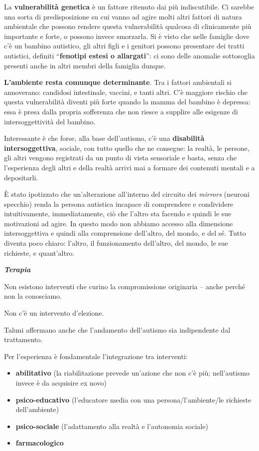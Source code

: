 \documentclass[]{article}
\begin{document}
La \textbf{vulnerabilità genetica} è un fattore ritenuto dai più
indiscutibile. Ci sarebbe una sorta di predisposizione su cui vanno ad
agire molti altri fattori di natura ambientale che possono rendere
questa vulnerabilità qualcosa di clinicamente più importante e forte, o
possono invece smorzarla. Si è visto che nelle famiglie dove c'è un
bambino autistico, gli altri figli e i genitori possono presentare dei
tratti autistici, definiti ``\textbf{fenotipi estesi o allargati}'': ci
sono delle anomalie sottosoglia presenti anche in altri membri della
famiglia dunque.

\textbf{L'ambiente resta comunque determinante}. Tra i fattori
ambientali si annoverano: candidosi intestinale, vaccini, e tanti altri.
C'è maggiore rischio che questa vulnerabilità diventi più forte quando
la mamma del bambino è depressa: essa è presa dalla propria sofferenza
che non riesce a supplire alle esigenze di intersoggettività del
bambino.

Interessante è che forse, alla base dell'autismo, c'è una
\textbf{disabilità intersoggettiva}, sociale, con tutto quello che ne
consegue: la realtà, le persone, gli altri vengono registrati da un
punto di vista sensoriale e basta, senza che l'esperienza degli altri e
della realtà arrivi mai a formare dei contenuti mentali e a depositarli.

È stato ipotizzato che un'alterazione all'interno del circuito dei
\emph{mirrors} (neuroni specchio) renda la persona autistica incapace di
comprendere e condividere intuitivamente, immediatamente, ciò che
l'altro sta facendo e quindi le sue motivazioni ad agire. In questo modo
non abbiamo accesso alla dimensione intersoggettiva e quindi alla
comprensione dell'altro, del mondo, e del sé. Tutto diventa poco chiaro:
l'altro, il funzionamento dell'altro, del mondo, le sue richieste, e
quant'altro.

\emph{\textbf{Terapia}}

Non esistono interventi che curino la compromissione originaria -- anche
perché non la conosciamo.

Non c'è un intervento d'elezione.

Taluni affermano anche che l'andamento dell'autismo sia indipendente dal
trattamento.

Per l'esperienza è fondamentale l'integrazione tra interventi:

\begin{itemize}
\item
  \textbf{abilitativo} (la riabilitazione prevede un'azione che non c'è
  più; nell'autismo invece è da acquisire ex novo)
\item
  \textbf{psico-educativo} (l'educatore media con una
  persona/l'ambiente/le richieste dell'ambiente)
\item
  \textbf{psico-sociale} (l'adattamento alla realtà e l'autonomia
  sociale)
\item
  \textbf{farmacologico}
\end{itemize}
\end{document}
